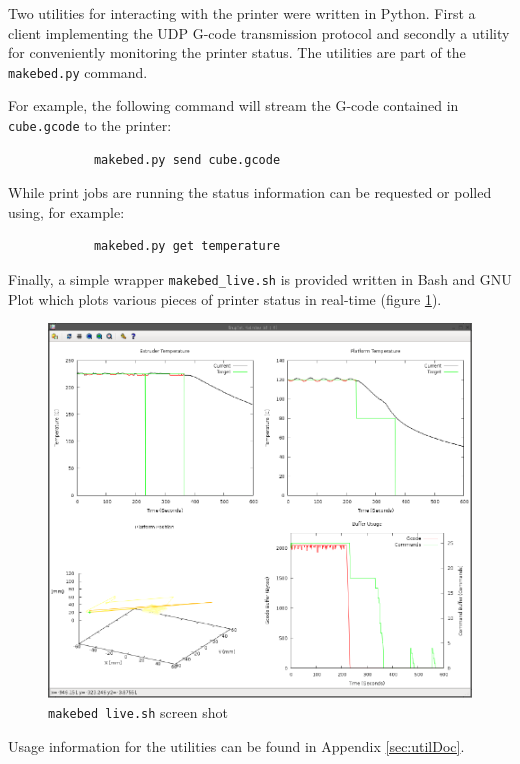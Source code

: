 		Two utilities for interacting with the printer were written in Python. First
		a client implementing the UDP G-code transmission protocol and secondly a
		utility for conveniently monitoring the printer status. The utilities are
		part of the \verb|makebed.py| command.
		
		For example, the following command will stream the G-code contained in
		\verb|cube.gcode| to the printer:
		\begin{verbatim}
			makebed.py send cube.gcode
		\end{verbatim}
		
		While print jobs are running the status information can be requested or
		polled using, for example:
		\begin{verbatim}
			makebed.py get temperature
		\end{verbatim}
		
		Finally, a simple wrapper \verb|makebed_live.sh| is provided written in Bash
		and GNU Plot which plots various pieces of printer status in real-time
		(figure \ref{fig:makebedlive}).
		
		\begin{figure}
			\includegraphics[width=1\textwidth]{diagrams/makebedlive.pdf}
			\caption{\texttt{makebed live.sh} screen shot}
			\label{fig:makebedlive}
		\end{figure}
		
		Usage information for the utilities can be found in Appendix
		\ref{sec:utilDoc}.
	

